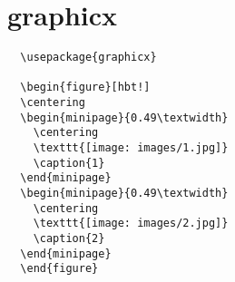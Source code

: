\section{graphicx \textcolor{green}{} \textcolor{blue}{}  \textcolor{cyan}{} }


\begin{verbatim}
  \usepackage{graphicx}

  \begin{figure}[hbt!]
  \centering
  \begin{minipage}{0.49\textwidth}
    \centering
    \texttt{[image: images/1.jpg]}
    \caption{1}
  \end{minipage}
  \begin{minipage}{0.49\textwidth}
    \centering
    \texttt{[image: images/2.jpg]}
    \caption{2}
  \end{minipage}
  \end{figure}
\end{verbatim}


\newpage
